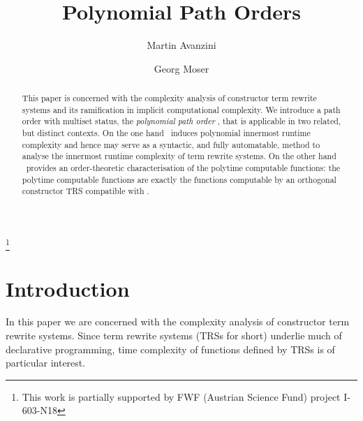 \documentclass{LMCS}
\begin{document}
\title[Polynomial Path Orders]{Polynomial Path Orders}

\author[M.~Avanzini]{Martin Avanzini}
\address{Institute of Computer Science\\University of Innsbruck\\ Austria}


\author[G.~Moser]{Georg Moser}
\address{\vspace{-18 pt}}
\thanks{This work is partially supported by FWF (Austrian Science Fund) project I-603-N18}

\renewcommand{\labelitemi}{-}



\begin{abstract}
This paper is concerned with the complexity analysis of
constructor term rewrite systems and its ramification in implicit
computational complexity.
We introduce a path order with multiset status, 
the \emph{polynomial path order} \POPSTAR, that is applicable
in two related, but distinct contexts.
On the one hand \POPSTAR\ induces polynomial innermost runtime complexity
and hence may serve as a syntactic, and fully automatable, method to analyse
the innermost runtime complexity of term rewrite systems.
On the other hand \POPSTAR\ provides an order-theoretic 
characterisation of the polytime computable functions: 
the polytime computable functions are exactly the functions
computable by an orthogonal constructor TRS compatible with \POPSTAR.
\end{abstract}

\maketitle

\section{Introduction}\label{s:intro}

In this paper we are concerned with the complexity analysis of
constructor term rewrite systems.
Since term rewrite systems (TRSs for short) underlie much of 
declarative programming, time complexity of functions defined by TRSs
is of particular interest.
\end{document}
